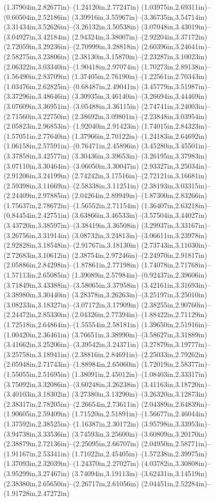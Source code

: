 (1.37904in,2.82677in)--(1.24120in,2.77247in) (1.03975in,2.69311in)--(0.60504in,2.52186in) (3.39916in,3.55967in)--(3.36735in,3.54714in) (3.31434in,3.52626in)--(3.26132in,3.50538in) (3.07048in,3.43019in)--(3.04927in,3.42184in) (2.94324in,3.38007in)--(2.92204in,3.37172in) (2.72059in,3.29236in)--(2.70999in,3.28818in) (2.60396in,3.24641in)--(2.58275in,3.23806in) (2.38130in,3.15870in)--(2.23287in,3.10023in) (2.06322in,3.03340in)--(1.90418in,2.97074in) (1.70273in,2.89138in)--(1.56490in,2.83709in) (1.37405in,2.76190in)--(1.22561in,2.70343in) (1.03476in,2.62825in)--(0.68487in,2.49041in) (3.45779in,3.51987in)--(3.37296in,3.48646in) (3.30935in,3.46140in)--(3.26694in,3.44469in) (3.07609in,3.36951in)--(3.05488in,3.36115in) (2.74741in,3.24003in)--(2.71560in,3.22750in) (2.38692in,3.09801in)--(2.23848in,3.03954in) (2.05823in,2.96853in)--(1.92040in,2.91423in) (1.74015in,2.84323in)--(1.57051in,2.77640in) (1.37966in,2.70122in)--(1.24183in,2.64692in) (1.06158in,2.57591in)--(0.76471in,2.45896in) (3.45280in,3.45501in)--(3.37858in,3.42577in) (3.30436in,3.39653in)--(3.26195in,3.37983in) (3.07110in,3.30464in)--(3.06050in,3.30047in) (2.93327in,3.25034in)--(2.91206in,3.24199in) (2.74242in,3.17516in)--(2.72121in,3.16681in) (2.59398in,3.11669in)--(2.58338in,3.11251in) (2.38193in,3.03315in)--(2.24409in,2.97885in) (2.04264in,2.89949in)--(1.87300in,2.83266in) (1.75637in,2.78672in)--(1.56552in,2.71154in) (1.36407in,2.63218in)--(0.84454in,2.42751in) (3.63866in,3.46533in)--(3.57504in,3.44027in) (3.43720in,3.38597in)--(3.38419in,3.36508in) (3.29937in,3.33167in)--(3.26756in,3.31914in) (3.08732in,3.24813in)--(3.06611in,3.23978in) (2.92828in,3.18548in)--(2.91767in,3.18130in) (2.73743in,3.11030in)--(2.72683in,3.10612in) (2.38754in,2.97246in)--(2.24970in,2.91817in) (2.05886in,2.84298in)--(1.87861in,2.77198in) (1.74078in,2.71768in)--(1.57113in,2.65085in) (1.39089in,2.57984in)--(0.92437in,2.39606in) (3.71849in,3.43388in)--(3.58065in,3.37958in) (3.42161in,3.31693in)--(3.38980in,3.30440in) (3.28378in,3.26263in)--(3.25197in,3.25010in) (3.08233in,3.18327in)--(3.07172in,3.17909in) (2.38255in,2.90760in)--(2.24472in,2.85330in) (2.04326in,2.77394in)--(1.88422in,2.71129in) (1.72518in,2.64864in)--(1.55554in,2.58181in) (1.39650in,2.51916in)--(1.00420in,2.36461in) (3.76651in,3.38990in)--(3.58627in,3.31889in) (3.41662in,3.25206in)--(3.39542in,3.24371in) (3.27879in,3.19777in)--(3.25758in,3.18941in) (2.38816in,2.84691in)--(2.25033in,2.79262in) (2.05948in,2.71743in)--(1.88984in,2.65060in) (1.72019in,2.58377in)--(1.55055in,2.51695in) (1.38091in,2.45012in)--(1.08403in,2.33317in) (3.75092in,3.32086in)--(3.60248in,3.26238in) (3.41163in,3.18720in)--(3.40103in,3.18302in) (3.27380in,3.13290in)--(3.26320in,3.12873in) (2.38317in,2.78205in)--(2.26654in,2.73611in) (2.04389in,2.64839in)--(1.90605in,2.59409in) (1.71520in,2.51891in)--(1.56677in,2.46044in) (1.37592in,2.38525in)--(1.16387in,2.30172in) (3.95798in,3.33953in)--(3.94738in,3.33536in) (3.74593in,3.25600in)--(3.60809in,3.20170in) (2.38879in,2.72136in)--(2.25095in,2.66707in) (2.04950in,2.58771in)--(1.91167in,2.53341in) (1.71022in,2.45405in)--(1.57238in,2.39975in) (1.37093in,2.32039in)--(1.24370in,2.27027in) (4.03782in,3.30808in)--(3.95299in,3.27467in) (3.74094in,3.19113in)--(3.62431in,3.14519in) (2.38380in,2.65650in)--(2.26717in,2.61056in) (2.04451in,2.52284in)--(1.91728in,2.47272in) 
